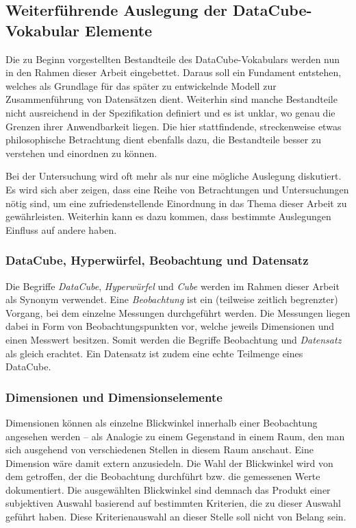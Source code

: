\documentclass[11pt]{article}
\newcommand{\com}[1]{\marginpar{\em {\small{#1}}}} %
\begin{document}
%
%
\subsection{Weiterführende Auslegung der DataCube-Vokabular Elemente}
\label{sec:chapterInterpretationDC}

Die zu Beginn vorgestellten Bestandteile des DataCube-Vokabulars werden nun in den Rahmen dieser Arbeit eingebettet. Daraus soll ein Fundament entstehen, welches als Grundlage für das später zu entwickelnde Modell zur Zusammenführung von Datensätzen dient. Weiterhin sind manche Bestandteile nicht ausreichend in der Spezifikation definiert und es ist unklar, wo genau die Grenzen ihrer Anwendbarkeit liegen. Die hier stattfindende, streckenweise etwas philosophische Betrachtung dient ebenfalls dazu, die Bestandteile besser zu verstehen und einordnen zu können.

\noindent
Bei der Untersuchung wird oft mehr als nur eine mögliche Auslegung diskutiert. Es wird sich aber zeigen, dass eine Reihe von Betrachtungen und Untersuchungen nötig sind, um eine zufriedenstellende Einordnung in das Thema dieser Arbeit zu gewährleisten. Weiterhin kann es dazu kommen, dass bestimmte Auslegungen Einfluss auf andere haben. 


%
%
\subsubsection{DataCube, Hyperwürfel, Beobachtung und Datensatz}

Die Begriffe \textit{DataCube}, \textit{Hyperwürfel} und \textit{Cube} werden im Rahmen dieser Arbeit als Synonym verwendet. Eine \emph{Beobachtung} ist ein (teilweise zeitlich begrenzter) Vorgang, bei dem einzelne Messungen durchgeführt werden. Die Messungen liegen dabei in Form von Beobachtungspunkten vor, welche jeweils Dimensionen und einen Messwert besitzen. Somit werden die Begriffe Beobachtung und \textit{Datensatz} als gleich erachtet. Ein Datensatz ist zudem eine echte Teilmenge eines DataCube.

%
%
\subsubsection{Dimensionen und Dimensionselemente}

Dimensionen\com{Blickwinkel} können als einzelne Blickwinkel innerhalb einer Beobachtung angesehen werden -- als Analogie zu einem Gegenstand in einem Raum, den man sich ausgehend von verschiedenen Stellen in diesem Raum anschaut. Eine Dimension wäre damit extern anzusiedeln. Die Wahl der Blickwinkel wird von dem getroffen, der die Beobachtung durchführt bzw. die gemessenen Werte dokumentiert. Die ausgewählten Blickwinkel sind demnach das Produkt einer subjektiven Auswahl basierend auf bestimmten Kriterien, die zu dieser Auswahl geführt haben. Diese Kriterienauswahl an dieser Stelle soll nicht von Belang sein. 
\end{document}
